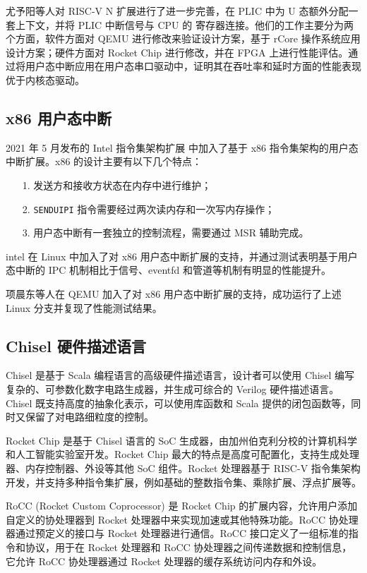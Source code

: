 尤予阳等人对 RISC-V N 扩展进行了进一步完善，在 PLIC 中为 U 态额外分配一套上下文，并将 PLIC 中断信号与 CPU 的 \FcsrUipUsip 寄存器连接。他们的工作主要分为两个方面，软件方面对 QEMU 进行修改来验证设计方案，基于 rCore 操作系统应用设计方案；硬件方面对 Rocket Chip 进行修改，并在 FPGA 上进行性能评估。通过将用户态中断应用在用户态串口驱动中，证明其在吞吐率和延时方面的性能表现优于内核态驱动。

\subsection{x86 用户态中断}

2021 年 5 月发布的 Intel 指令集架构扩展 \cite{inteluintr} 中加入了基于 x86 指令集架构的用户态中断扩展。x86 的设计主要有以下几个特点：

\begin{itemize}
    \item[1.] 发送方和接收方状态在内存中进行维护；
    \item[2.] {\tt SENDUIPI} 指令需要经过两次读内存和一次写内存操作；
    \item[3.] 用户态中断有一套独立的控制流程，需要通过 MSR 辅助完成。
\end{itemize}

intel 在 Linux 中加入了对 x86 用户态中断扩展的支持，并通过测试表明基于用户态中断的 IPC 机制相比于信号、eventfd 和管道等机制有明显的性能提升\cite{x86uintr}。

项晨东等人在 QEMU 加入了对 x86 用户态中断扩展的支持，成功运行了上述 Linux 分支并复现了性能测试结果。

\subsection{Chisel 硬件描述语言}

Chisel \cite{chisel} 是基于 Scala 编程语言的高级硬件描述语言，设计者可以使用 Chisel 编写复杂的、可参数化数字电路生成器，并生成可综合的 Verilog 硬件描述语言。Chisel 既支持高度的抽象化表示，可以使用库函数和 Scala 提供的闭包函数等，同时又保留了对电路细粒度的控制。

Rocket Chip 是基于 Chisel 语言的 SoC 生成器，由加州伯克利分校的计算机科学和人工智能实验室开发。Rocket Chip 最大的特点是高度可配置化，支持生成处理器、内存控制器、外设等其他 SoC 组件。Rocket 处理器基于 RISC-V 指令集架构开发，并支持多种指令集扩展，例如基础的整数指令集、乘除扩展、浮点扩展等。

RoCC (Rocket Custom Coprocessor) \cite{rocc} 是 Rocket Chip 的扩展内容，允许用户添加自定义的协处理器到 Rocket 处理器中来实现加速或其他特殊功能。RoCC 协处理器通过预定义的接口与 Rocket 处理器进行通信。RoCC 接口定义了一组标准的指令和协议，用于在 Rocket 处理器和 RoCC 协处理器之间传递数据和控制信息，它允许 RoCC 协处理器通过 Rocket 处理器的缓存系统访问内存和外设。


